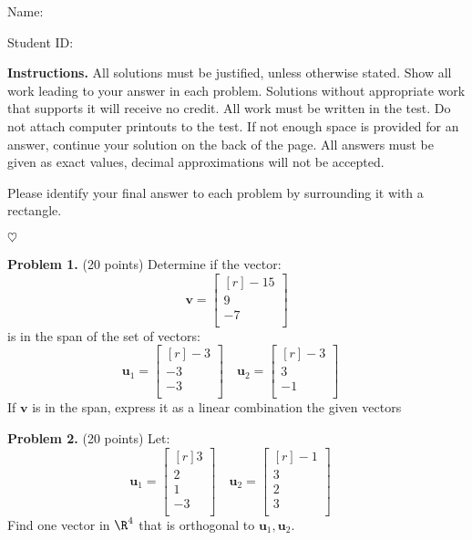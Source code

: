 \documentclass[12pt]{article}
\begin{document}
Name: \hrulefill

\bigskip
Student ID: \hrulefill

\bigskip
\textbf{Instructions.} All solutions must be justified, unless otherwise stated. Show all work leading to your answer in each problem. Solutions without appropriate work that supports it will receive no credit. All work must be written in the test. Do not attach computer printouts to the test. If not enough space is provided for an answer, continue your solution on the back of the page. All answers must be given as exact values, decimal approximations will not be accepted.

Please identify your final answer to each problem by surrounding it with a rectangle.

\vfill
\hfill$\heartsuit$

\clearpage

\textbf{Problem 1.} (20 points)
Determine if the vector:
\[
\mathbf{v}=\begin{bmatrix*}[r]-15\\ 9\\ -7\\ \end{bmatrix*}
\]
is in the span of the set of vectors:
\[
\mathbf{u}_1=\begin{bmatrix*}[r]-3\\ -3\\ -3\\ \end{bmatrix*}\quad
\mathbf{u}_2=\begin{bmatrix*}[r]-3\\ 3\\ -1\\ \end{bmatrix*}\quad
\]
If $\mathbf{v}$ is in the span, 
express it as a linear combination the given vectors


\clearpage


\textbf{Problem 2.} (20 points) 
Let:
\[\mathbf{u}_1=\begin{bmatrix*}[r]3\\ 2\\ 1\\ -3\\ \end{bmatrix*}\quad
\mathbf{u}_2=\begin{bmatrix*}[r]-1\\ 3\\ 2\\ 3\\ \end{bmatrix*}\quad
\]
Find one vector in $\R^{4}$ that is orthogonal to $\textbf{u}_1, \textbf{u}_2$.
\end{document}
